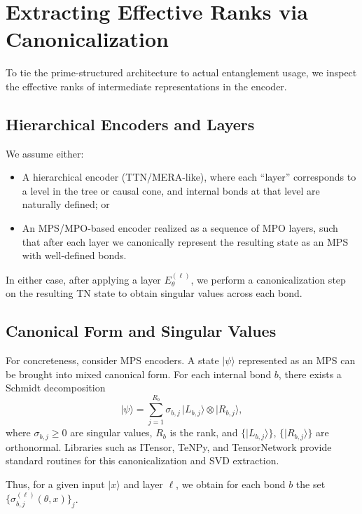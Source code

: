\documentclass[11pt]{article}
\begin{document}
\section{Extracting Effective Ranks via Canonicalization}

To tie the prime-structured architecture to actual entanglement usage, we inspect the effective ranks of intermediate representations in the encoder.

\subsection{Hierarchical Encoders and Layers}

We assume either:
\begin{itemize}[leftmargin=1.5em]
    \item A hierarchical encoder (TTN/MERA-like), where each ``layer'' corresponds to a level in the tree or causal cone, and internal bonds at that level are naturally defined; or

    \item An MPS/MPO-based encoder realized as a sequence of MPO layers, such that after each layer we canonically represent the resulting state as an MPS with well-defined bonds.
\end{itemize}

In either case, after applying a layer $E^{(\ell)}_\theta$, we perform a canonicalization step on the resulting TN state to obtain singular values across each bond.

\subsection{Canonical Form and Singular Values}

For concreteness, consider MPS encoders. A state $\lvert \psi \rangle$ represented as an MPS can be brought into mixed canonical form. For each internal bond $b$, there exists a Schmidt decomposition
\[
\lvert \psi \rangle = \sum_{j=1}^{R_b} \sigma_{b,j} \, \lvert L_{b,j} \rangle \otimes \lvert R_{b,j} \rangle,
\]
where $\sigma_{b,j}\ge 0$ are singular values, $R_b$ is the rank, and $\{\lvert L_{b,j} \rangle\}$, $\{\lvert R_{b,j} \rangle\}$ are orthonormal. Libraries such as ITensor, TeNPy, and TensorNetwork provide standard routines for this canonicalization and SVD extraction.

Thus, for a given input $\lvert x \rangle$ and layer $\ell$, we obtain for each bond $b$ the set $\{\sigma_{b,j}^{(\ell)}(\theta,x)\}_{j}$.
\end{document}
